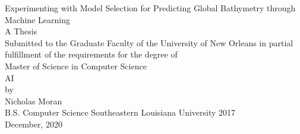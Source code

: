 \begin{titlepage}
    \begin{center}
        Experimenting with Model Selection for Predicting Global Bathymetry through Machine Learning\\
        \vspace*{66pt}
        A Thesis\\
        \vspace*{66pt}
        Submitted to the Graduate Faculty of the  University of New Orleans  in partial fulfillment of the  requirements for the degree of \\
        \vspace*{66pt}
        Master of Science in Computer Science  \\
        AI \\
        \vspace*{66pt}
        by\\
        Nicholas Moran\\
        B.S. Computer Science Southeastern Louisiana University 2017\\
        December, 2020\\         
    \end{center}
 \end{titlepage}